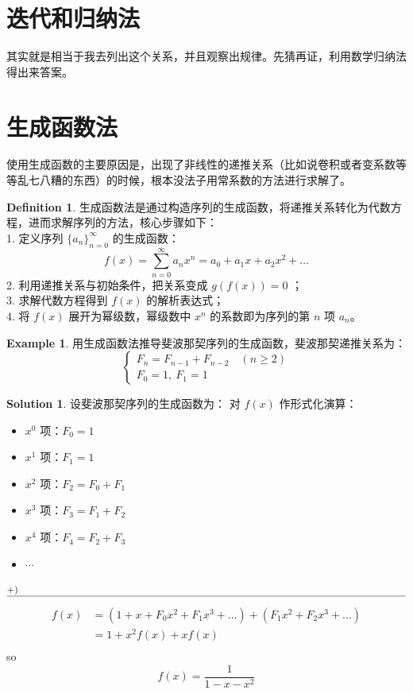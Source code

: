 \documentclass[oneside]{book}
\theoremstyle{definition}
\newtheorem{example}{Example}[section]
\newtheorem{definition}{Definition}[section]
\newtheorem*{sol}{Solution}
\begin{document}
 
  
  
  \section{迭代和归纳法}
  其实就是相当于我去列出这个关系，并且观察出规律。先猜再证，利用数学归纳法得出来答案。
   \section{生成函数法}
  使用生成函数的主要原因是，出现了非线性的递推关系（比如说卷积或者变系数等等乱七八糟的东西）的时候，根本没法子用常系数的方法进行求解了。
  \begin{definition}
  	生成函数法是通过构造序列的生成函数，将递推关系转化为代数方程，进而求解序列的方法，核心步骤如下：  \\
  	1. 定义序列 \( \{a_n\}_{n=0}^\infty \) 的生成函数：  
  	\[
  	f(x) = \sum_{n=0}^\infty a_n x^n = a_0 + a_1 x + a_2 x^2 + \dots
  	\]  
  	2. 利用递推关系与初始条件，把关系变成 \( g(f(x))=0 \) ；\\  
  	3. 求解代数方程得到 \( f(x) \) 的解析表达式；  \\
  	4. 将 \( f(x) \) 展开为幂级数，幂级数中 \( x^n \) 的系数即为序列的第 \( n \) 项 \( a_n \)。
  \end{definition}
  
  \begin{example}
  	用生成函数法推导斐波那契序列的生成函数，斐波那契递推关系为：  
  	\[
  	\begin{cases}
  		F_n = F_{n-1} + F_{n-2} \quad (n \geq 2) \\
  		F_0 = 1,\ F_1 = 1
  	\end{cases}
  	\]  
  	  \end{example}
  \begin{sol}
  		设斐波那契序列的生成函数为：  
  	对 \( f(x) \) 作形式化演算：
  	\begin{itemize}
  		\item \( x^0 \) 项：\( F_0 = 1 \)
  		\item \( x^1 \) 项：\( F_1 = 1 \)
  		\item \( x^2 \) 项：\( F_2 = F_0 + F_1 \)
  		\item \( x^3 \) 项：\( F_3 = F_1 + F_2 \)
  		\item \( x^4 \) 项：\( F_4 = F_2 + F_3 \)
  		\item \(\cdots\)
  	\end{itemize}
  	\[
  	\begin{aligned}
  		&+)\quad\quad\quad\quad\quad\quad\quad\quad\quad\quad\quad\quad\quad\quad\quad\quad\quad\quad\quad\quad\quad\quad\quad\quad\quad\quad\quad\quad\quad\quad\quad\quad\quad\quad\quad\quad\quad\quad\quad\quad\quad\\
  		\hline
  	\end{aligned}
  	\]
  	\[
  	\begin{aligned}
  		f(x) &=(1+x+F_0x^2+F_1x^3+\dots)+(F_1x^2+F_2x^3+\dots)\\
  		&=1+x^2f(x)+xf(x)\\
  	\end{aligned}
  	\]
  	so
  	\[ f(x) = \frac{1}{1 - x - x^2}\]	
  
  \end{sol}
  
\end{document}
